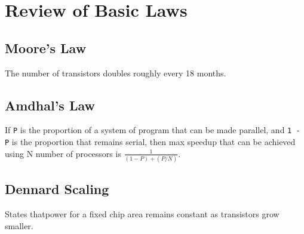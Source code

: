 \section{Review of Basic Laws}
\label{review}

\subsection{Moore's Law}
The number of transistors doubles roughly every 18 months.
\subsection{Amdhal's Law}
If \texttt{P} is the proportion of a system of program that can be made parallel, and \texttt{1 - P} is the proportion that remains serial, then max speedup that can be achieved using N number of processors is $\frac{1}{(1-P) + (P/N)}$.
\subsection{Dennard Scaling}
States thatpower for a fixed chip area remains constant as transistors grow smaller.
